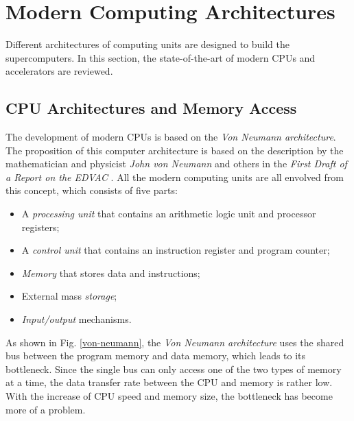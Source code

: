 \section{Modern Computing Architectures}\label{Modern Computing Architectures}

Different architectures of computing units are designed to build the supercomputers. In this section, the state-of-the-art of modern CPUs and accelerators are reviewed.

\subsection{CPU Architectures and Memory Access}

The development of modern CPUs is based on the \textit{Von Neumann architecture}. The proposition of this computer architecture is based on the description by the mathematician and physicist \textit{John von Neumann} and others in the \textit{First Draft of a Report on the EDVAC} \cite{von1945first}. All the modern computing units are all envolved from this concept, which consists of five parts:

\begin{itemize}
	\item A \textit{processing unit} that contains an arithmetic logic unit and processor registers;
	\item A \textit{control unit} that contains an instruction register and program counter;
	\item \textit{Memory} that stores data and instructions;
	\item External mass \textit{storage};
	\item \textit{Input/output} mechanisms.
\end{itemize}

As shown in Fig. \ref{von-neumann}, the \textit{Von Neumann architecture} uses the shared bus between the program memory and data memory, which leads to its bottleneck. Since the single bus can only access one of the two types of memory at a time, the data transfer rate between the CPU and memory is rather low. With the increase of CPU speed and memory size,  the bottleneck has become more of a problem.

